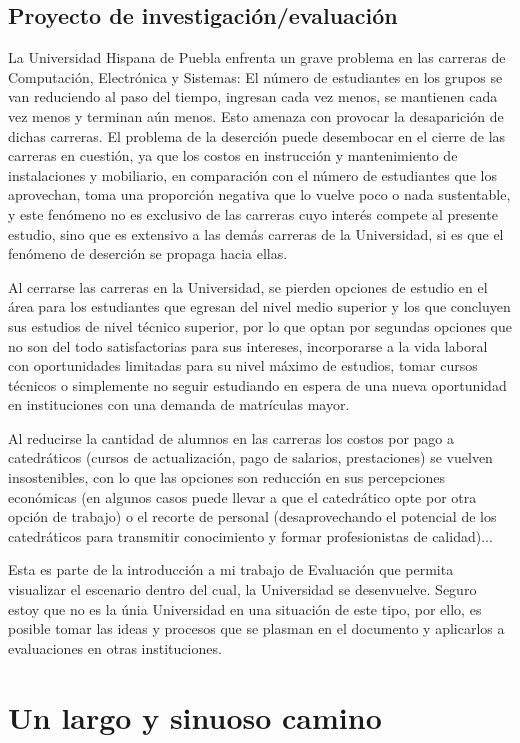 \section{Proyecto de investigación/evaluación}
La Universidad Hispana de Puebla enfrenta un grave problema en las carreras de Computación, Electrónica y Sistemas: El número de estudiantes en los grupos se van reduciendo al paso del tiempo, ingresan cada vez menos, se mantienen cada vez menos y terminan aún menos. Esto amenaza con provocar la desaparición de dichas carreras.
El problema de la deserción puede desembocar en el cierre de las carreras en cuestión, ya que los costos en instrucción y mantenimiento de instalaciones y mobiliario, en comparación con el número de estudiantes que los aprovechan, toma una proporción negativa que lo vuelve poco o nada sustentable, y este fenómeno no es exclusivo de las carreras cuyo interés compete al presente estudio, sino que es extensivo a las demás carreras de la Universidad, si es que el fenómeno de deserción se propaga hacia ellas.

Al cerrarse las carreras en la Universidad, se pierden opciones de estudio en el área para los estudiantes que egresan del nivel medio superior y los que concluyen sus estudios de nivel técnico superior, por lo que optan por segundas opciones que no son del todo satisfactorias para sus intereses, incorporarse a la vida laboral con oportunidades limitadas para su nivel máximo de estudios, tomar cursos técnicos o simplemente no seguir estudiando en espera de una nueva oportunidad en instituciones con una demanda de matrículas mayor.

Al reducirse la cantidad de alumnos en las carreras los costos por pago a catedráticos (cursos de actualización, pago de salarios, prestaciones) se vuelven insostenibles, con lo que las opciones son reducción en sus percepciones económicas (en algunos casos puede llevar a que el catedrático opte por otra opción de trabajo) o el recorte de personal (desaprovechando el potencial de los catedráticos para transmitir conocimiento y formar profesionistas de calidad)...

Esta es parte de la introducción a mi trabajo de Evaluación que permita visualizar el escenario dentro del cual, la Universidad se desenvuelve. Seguro estoy que no es la únia Universidad en una situación de este tipo, por ello, es posible tomar las ideas y procesos que se plasman en el documento y aplicarlos a evaluaciones en otras instituciones.

\chapter{Un largo y sinuoso camino}
